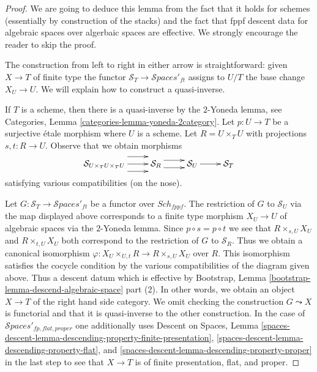 \documentclass{stacks-project}
\theoremstyle{plain}
\theoremstyle{definition}
\theoremstyle{remark}
\numberwithin{equation}{subsection}
\def\Sch{\mathit{Sch}}
\def\Spacesstack{\mathcal{S}\!\mathit{paces}}
\begin{document}
\begin{proof}
We are going to deduce this lemma from the fact that it holds for schemes
(essentially by construction of the stacks) and the fact that fppf descent
data for algebraic spaces over algerbaic spaces are effective.
We strongly encourage the reader to skip the proof.

\medskip\noindent
The construction from left to right in either arrow is straightforward:
given $X \to T$ of finite type the functor
$\mathcal{S}_T \to  \Spacesstack'_{ft}$ assigns to $U/T$ the
base change $X_U \to U$. We will explain how to construct a quasi-inverse.

\medskip\noindent
If $T$ is a scheme, then there is a quasi-inverse by the $2$-Yoneda lemma, see
Categories, Lemma \ref{categories-lemma-yoneda-2category}.
Let $p : U \to T$ be a surjective \'etale morphism where $U$ is a scheme.
Let $R = U \times_T U$ with projections $s, t : R \to U$.
Observe that we obtain morphisms
$$
\xymatrix{
\mathcal{S}_{U \times_T U \times_T U} \ar@<2ex>[r] \ar[r] \ar@<-2ex>[r] &
\mathcal{S}_R \ar@<1ex>[r] \ar@<-1ex>[r] &
\mathcal{S}_U \ar[r] &
\mathcal{S}_T
}
$$
satisfying various compatibilities (on the nose).

\medskip\noindent
Let $G : \mathcal{S}_T \to \Spacesstack'_{ft}$ be a functor over $\Sch_{fppf}$.
The restriction of $G$ to $\mathcal{S}_U$ via the map displayed above
corresponds to a finite type morphism $X_U \to U$ of algebraic spaces
via the $2$-Yoneda lemma. Since $p \circ s = p \circ t$ we see that
$R \times_{s, U} X_U$ and $R \times_{t, U} X_U$ both correspond to the
restriction of $G$ to $\mathcal{S}_R$. Thus we obtain a canonical isomorphism
$\varphi : X_U \times_{U, t} R \to R \times_{s, U} X_U$ over $R$.
This isomorphism satisfies the cocycle condition by the
various compatibilities of the diagram given above.
Thus a descent datum which is effective by Bootstrap, Lemma
\ref{bootstrap-lemma-descend-algebraic-space} part (2).
In other words, we obtain an object $X \to T$ of the right hand side
category. We omit checking the construction $G \leadsto X$
is functorial and that it is quasi-inverse to the other construction.
In the case of $\Spacesstack'_{fp, flat, proper}$ one additionally uses
Descent on Spaces, Lemma
\ref{spaces-descent-lemma-descending-property-finite-presentation},
\ref{spaces-descent-lemma-descending-property-flat}, and
\ref{spaces-descent-lemma-descending-property-proper}
in the last step to see that $X \to T$ is of finite presentation,
flat, and proper.
\end{proof}
\end{document}
